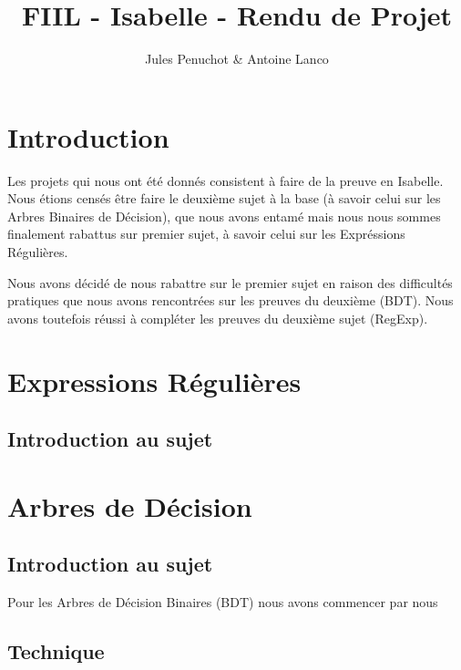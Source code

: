 \documentclass{article}
\title{FIIL - Isabelle - Rendu de Projet}
\author{Jules Penuchot \& Antoine Lanco}
\begin{document}
\maketitle

\section{Introduction}

Les projets qui nous ont été donnés consistent à faire de la preuve en Isabelle. Nous étions censés être faire le deuxième sujet à la base (à savoir celui sur les Arbres Binaires de Décision), que nous avons entamé mais nous nous sommes finalement rabattus sur premier sujet, à savoir celui sur les Expréssions Régulières.

Nous avons décidé de nous rabattre sur le premier sujet en raison des difficultés pratiques que nous avons rencontrées sur les preuves du deuxième (BDT). Nous avons toutefois réussi à compléter les preuves du deuxième sujet (RegExp).

\section{Expressions Régulières}

\subsection{Introduction au sujet}



\section{Arbres de Décision}

\subsection{Introduction au sujet}

Pour les Arbres de Décision Binaires (BDT) nous avons commencer par nous 

\subsection{Technique}
\end{document}
